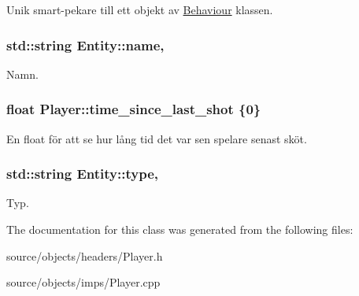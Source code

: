 Unik smart-\/pekare till ett objekt av \hyperlink{classBehaviour}{Behaviour} klassen. 

\hypertarget{classEntity_a931b21fbdebb1a5963b4bcab5df128f5}{
\subsubsection[{name}]{\setlength{\rightskip}{0pt plus 5cm}std\+::string Entity\+::name\hspace{0.3cm}{\ttfamily [protected]}, {\ttfamily [inherited]}}}\label{classEntity_a931b21fbdebb1a5963b4bcab5df128f5}


Namn. 

\hypertarget{classPlayer_a75e887d14a0eafeeba86bec0e9a8d086}{
\subsubsection[{time\+\_\+since\+\_\+last\+\_\+shot}]{\setlength{\rightskip}{0pt plus 5cm}float Player\+::time\+\_\+since\+\_\+last\+\_\+shot \{0\}}}\label{classPlayer_a75e887d14a0eafeeba86bec0e9a8d086}


En float för att se hur lång tid det var sen spelare senast sköt. 

\hypertarget{classEntity_a298a9ebf2474bb00874b5ff6a0d637ef}{
\subsubsection[{type}]{\setlength{\rightskip}{0pt plus 5cm}std\+::string Entity\+::type\hspace{0.3cm}{\ttfamily [protected]}, {\ttfamily [inherited]}}}\label{classEntity_a298a9ebf2474bb00874b5ff6a0d637ef}


Typ. 



The documentation for this class was generated from the following files\+:\begin{DoxyCompactItemize}
\item 
source/objects/headers/Player.\+h\item 
source/objects/imps/Player.\+cpp\end{DoxyCompactItemize}
